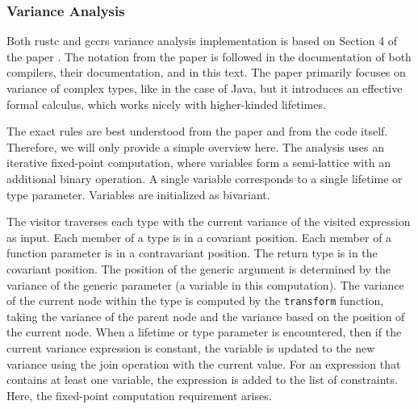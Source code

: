 \documentclass[
  11pt,
  twoside,symmetric]{report}
\begin{document}
\subsubsection{Variance Analysis}\label{variance-analysis}

Both rustc and gccrs variance analysis implementation is based on
Section 4 of the paper . The
notation from the paper is followed in the documentation of both
compilers, their documentation, and in this text. The paper primarily
focuses on variance of complex types, like in the case of Java, but it
introduces an effective formal calculus, which works nicely with
higher-kinded lifetimes.

The exact rules are best understood from the paper and from the code
itself. Therefore, we will only provide a simple overview here. The
analysis uses an iterative fixed-point computation, where variables form
a semi-lattice with an additional binary operation. A single variable
corresponds to a single lifetime or type parameter. Variables are
initialized as bivariant.

The visitor traverses each type with the current variance of the visited
expression as input. Each member of a type is in a covariant position.
Each member of a function parameter is in a contravariant position. The
return type is in the covariant position. The position of the generic
argument is determined by the variance of the generic parameter (a
variable in this computation). The variance of the current node within
the type is computed by the \texttt{transform} function, taking the
variance of the parent node and the variance based on the position of
the current node. When a lifetime or type parameter is encountered, then
if the current variance expression is constant, the variable is updated
to the new variance using the join operation with the current value. For
an expression that contains at least one variable, the expression is
added to the list of constraints. Here, the fixed-point computation
requirement arises.
\end{document}
